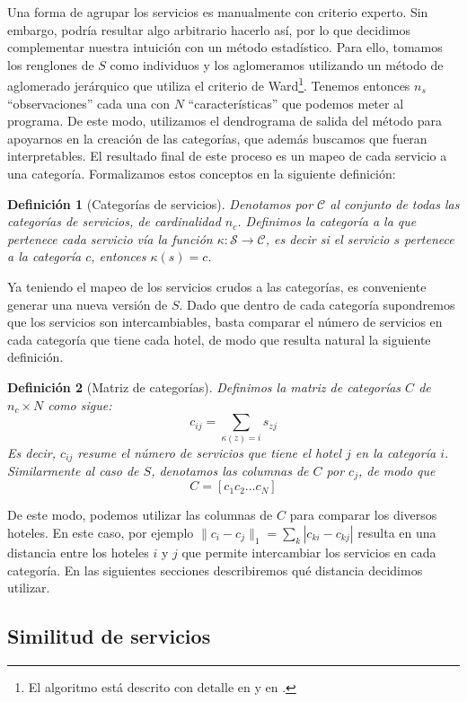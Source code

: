 \documentclass[12pt]{report}
\newtheorem{defn}{Definici\'on}[chapter]
\begin{document}
Una forma de agrupar los servicios es manualmente con criterio experto. Sin embargo, podría resultar algo arbitrario hacerlo así, por lo que decidimos complementar nuestra intuición con un método estadístico. Para ello, tomamos los renglones de $S$ como individuos y los aglomeramos utilizando un método de aglomerado jerárquico que utiliza el criterio de Ward\footnote{El algoritmo está descrito con detalle en \cite{ward} y en \cite{ward-notes}.}. Tenemos entonces $n_s$ ``observaciones'' cada una con $N$ ``características'' que podemos meter al programa. De este modo, utilizamos el dendrograma de salida del método para apoyarnos en la creación de las categorías, que además buscamos que fueran interpretables. El resultado final de este proceso es un mapeo de cada servicio a una categoría. Formalizamos estos conceptos en la siguiente definición:
\begin{defn}[Categorías de servicios]
Denotamos por $\mathcal{C}$ al conjunto de todas las categorías de servicios, de cardinalidad $n_c$. Definimos la categoría a la que pertenece cada servicio vía la función $\kappa: \mathcal{S} \to \mathcal{C}$, es decir si el servicio $s$ pertenece a la categoría $c$, entonces $\kappa(s) = c$.
\end{defn}
Ya teniendo el mapeo de los servicios crudos a las categorías, es conveniente generar una nueva versión de $S$. Dado que dentro de cada categoría supondremos que los servicios son intercambiables, basta comparar el número de servicios en cada categoría que tiene cada hotel, de modo que resulta natural la siguiente definición.
\begin{defn}[Matriz de categorías]
Definimos la matriz de categorías $C$ de $n_c \times N$ como sigue:
\[
c_{ij} = \sum_{\kappa(z) = i} s_{zj}
\]
Es decir, $c_{ij}$ resume el número de servicios que tiene el hotel $j$ en la categoría $i$. Similarmente al caso de $S$, denotamos las columnas de $C$ por $c_j$, de modo que
\[
C = [c_1 c_2 \dots c_N]
\]
\end{defn}
De este modo, podemos utilizar las columnas de $C$ para comparar los diversos hoteles. En este caso, por ejemplo $\|c_i - c_j\|_1 = \sum_k |c_{ki} - c_{kj}|$ resulta en una distancia entre los hoteles $i$ y $j$ que permite intercambiar los servicios en cada categoría. En las siguientes secciones describiremos qué distancia decidimos utilizar.

\subsection*{Similitud de servicios}
\end{document}

